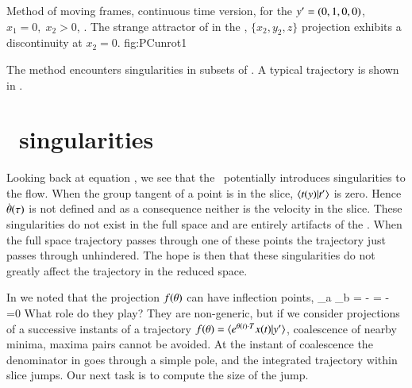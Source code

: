 {}{
Method of moving frames, continuous time version, for the
${y'}=(0,1,0,0)$,
$x_1=0,\;x_2>0$, \slice. The strange attractor of
 in the \reducedsp,
$\{x_2,y_2,z\}$ projection exhibits a discontinuity at
$x_2=0$.
}
{fig:PCunrot1}

The method encounters singularities in
subsets of \statesp{}.
A typical trajectory is shown in .

    \fi %
	
	
\section{\Slice\ singularities}
\label{sect:sliceSing}

Looking back at equation , we see that the \mslices\ potentially introduces singularities to the flow. When the group tangent of a point is in the slice, $\braket{\groupTan(\sspRed)}{\sliceTan{}}$ is zero. Hence  $\dot{{\bf \theta}}(\tau)$ is not defined and as a consequence neither is the velocity in the slice. These singularities do not exist in the full space and are entirely artifacts of the \mslices. When the full space trajectory passes through one of these points the trajectory just passes through unhindered. The hope is then that these singularities do not greatly affect the trajectory in the reduced space.

	\ifarticle
	\else
	
In  we noted that the projection $f({\bf \theta})$
can have inflection points,
\beq
{}
     {\partial \gSpace_a \partial \gSpace_b}
    =
  - =
  - =0
What role do they play? They are non-generic, but
if we consider projections of a successive instants of a trajectory
$f(\gSpace)=\braket{e^{\gSpace(t) \cdot \Lg} \ssp(t)}{\slicep}$, coalescence of
nearby minima, maxima pairs cannot be avoided. At the instant of coalescence
the denominator in  goes through a simple pole,
and the integrated trajectory within slice jumps. Our next task is
to compute the size of the jump.

